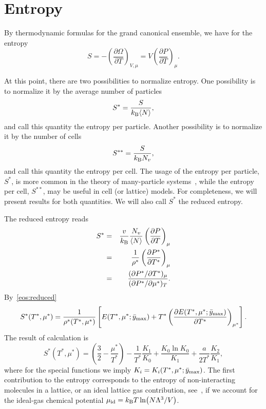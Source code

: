 \documentclass[12pt]{article}
\numberwithin{equation}{section}
\begin{document}
	
	
	\pagebreak
	\section{Entropy}
	By thermodynamic formulas for the grand canonical ensemble, we have for the entropy
	\begin{equation}
		S = -\left(\frac{\partial \Omega}{\partial T}\right)_{V,\mu} = V\left(\frac{\partial P}{\partial T}\right)_{\mu}.
	\end{equation} 
	
	At this point, there are two possibilities to normalize entropy. One possibility is to normalize it by the average number of particles
	\begin{equation}
		S^{*} = \frac{S}{k_{\rm B} \langle N \rangle},
	\end{equation}
	and call this quantity the entropy per particle. Another possibility is to normalize it by the number of cells
	\begin{equation}
		S^{**} = \frac{S}{k_{\rm B}N_v},
	\end{equation}
	and call this quantity the entropy per cell. The usage of the entropy per particle, $S^*$, is more common in the theory of many-particle systems~\cite{HansenMcDonald13}, while the entropy per cell, $S^{**}$, may be useful in cell (or lattice) models. For completeness, we will present results for both quantities. We will also call $S^*$ the reduced entropy.
	
	
	The reduced entropy reads
	\begin{eqnarray}
		S^* & = & \frac{v}{k_{\rm B}} \frac{N_v}{\langle N \rangle} \left(\frac{\partial P}{\partial T}\right)_{\mu}
		\\
		& = & \frac{1}{\rho^*}\left(\frac{\partial P^*}{\partial T^*}\right)_{\mu}
		\\
		& = & \frac{(\partial P^* / \partial T^*)_{\mu}}{(\partial P^* / \partial \mu^*)_T}.
	\end{eqnarray}
	By~\eqref{eos:reduced}
	\begin{equation}
		\label{eq:entropy}
		S^*(T^*,\mu^*) = \frac{1}{\rho^*(T^*,\mu^*)} 
		\left[ 
		E(T^*,\mu^*;\bar{y}_{\rm max}) + T^* \left(\frac{\partial E(T^*,\mu^*;\bar{y}_{\rm max})}{\partial T^*}\right)_{\mu^*} 
		\right].
	\end{equation}
	The result of calculation is
	\begin{equation}
		\label{S_vs_T_mu}
		S^*(T^*,\mu^*) = \left(\frac{3}{2} - \frac{\mu^*}{T^*}\right) - \frac{1}{T^*}\frac{K_1}{K_0} + \frac{K_0 \ln K_0}{K_1} + \frac{a}{2T^*} \frac{K_2}{K_1},
	\end{equation}
	where for the special functions we imply $K_i = K_i(T^*,\mu^*;\bar{y}_{\rm max})$.
	The first contribution to the entropy corresponds to the entropy of non-interacting molecules in a lattice, or an ideal lattice gas contribution, see~\cite[(47.4)]{Hill56}, if we account for the ideal-gas chemical potential $\mu_{\rm id} = k_{\rm B}T \ln(N\Lambda^3/V)$. 
	
\end{document}
